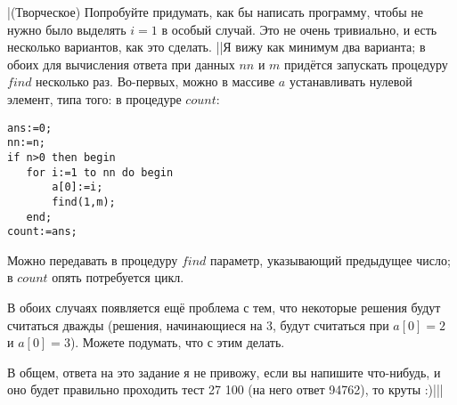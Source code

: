\task|(Творческое) Попробуйте придумать, как бы написать программу, чтобы 
не нужно было выделять $i=1$ в особый случай. Это не очень тривиально, и есть 
несколько вариантов, как это сделать.
||Я вижу как минимум два варианта; в обоих для вычисления ответа при данных $nn$ и 
$m$ придётся запускать процедуру $find$ несколько раз. Во-первых, можно в массиве $a$ 
устанавливать нулевой элемент, типа того: в процедуре $count$:
\begin{codesampleo}\begin{verbatim}
ans:=0;
nn:=n;
if n>0 then begin
   for i:=1 to nn do begin
       a[0]:=i;
       find(1,m);
   end;
count:=ans;
\end{verbatim}
\end{codesampleo}

Можно передавать в процедуру $find$ параметр, указывающий предыдущее число; в 
$count$ опять потребуется цикл.

В обоих случаях появляется ещё проблема с тем, что некоторые решения будут
считаться дважды (решения, начинающиеся на 3, будут считаться при $a[0]=2$ и
$a[0]=3$). Можете подумать, что с этим делать.

В общем, ответа на это задание я не привожу, если вы напишите что-нибудь, и оно 
будет правильно проходить тест 27 100 (на него ответ 94762), то круты :)|||


